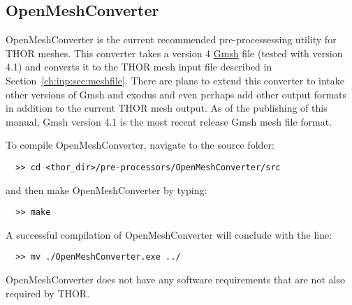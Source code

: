 \subsection{OpenMeshConverter}\label{ch:getstart:sec:preproc:subsec:meshconv}

OpenMeshConverter is the current recommended pre-processessing utility for \ac{THOR} meshes.
This converter takes a version 4 \href{https://gmsh.info/}{Gmsh} file (tested with version 4.1) and converts it to the \ac{THOR} mesh input file described in Section~\ref{ch:inp:sec:meshfile}.
There are plans to extend this converter to intake other versions of Gmsh and exodus and even perhaps add other output formats in addition to the current \ac{THOR} mesh output.
As of the publishing of this manual, Gmsh version 4.1 is the most recent release Gmsh mesh file format.

To compile OpenMeshConverter, navigate to the source folder:
\begin{verbatim}
  >> cd <thor_dir>/pre-processors/OpenMeshConverter/src
\end{verbatim}
and then make OpenMeshConverter by typing:
\begin{verbatim}
  >> make
\end{verbatim}
A successful compilation of OpenMeshConverter will conclude with the line:
\begin{verbatim}
  >> mv ./OpenMeshConverter.exe ../
\end{verbatim}
OpenMeshConverter does not have any software requirements that are not also required by \ac{THOR}.


